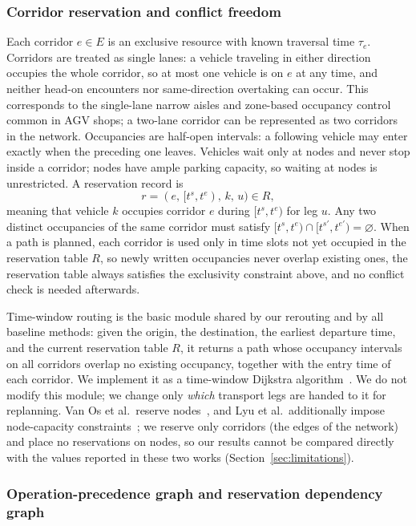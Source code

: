 \documentclass[manuscript,screen,review]{acmart}
\begin{document}
\subsubsection{Corridor reservation and conflict freedom}
\label{sec:reservation}

Each corridor \(e\in E\) is an exclusive resource with known traversal time \(\tau_e\). Corridors are treated as single lanes:
a vehicle traveling in either direction occupies the whole corridor, so at most one vehicle is on \(e\) at any time,
and neither head-on encounters nor same-direction overtaking can occur.
This corresponds to the single-lane narrow aisles and zone-based occupancy control common in AGV shops;
a two-lane corridor can be represented as two corridors in the network.
Occupancies are half-open intervals: a following vehicle may enter exactly when the preceding one leaves.
Vehicles wait only at nodes and never stop inside a corridor; nodes have ample parking capacity, so waiting at nodes is unrestricted.
A reservation record is
\[
r=(e,\,[t^s,t^e),\,k,\,u)\in R,
\]
meaning that vehicle \(k\) occupies corridor \(e\) during \([t^s,t^e)\) for leg \(u\).
Any two distinct occupancies of the same corridor must satisfy
\([t^s,t^e)\cap[t^{s\prime},t^{e\prime})=\varnothing\).
When a path is planned, each corridor is used only in time slots not yet occupied in the reservation table \(R\),
so newly written occupancies never overlap existing ones, the reservation table always satisfies the exclusivity constraint above, and no conflict check is needed afterwards.

Time-window routing is the basic module shared by our rerouting and by all baseline methods: given the origin, the destination, the earliest departure time, and the current reservation table \(R\),
it returns a path whose occupancy intervals on all corridors overlap no existing occupancy, together with the entry time of each corridor.
We implement it as a time-window Dijkstra algorithm~\cite{sun2023integrated}. We do not modify this module;
we change only \emph{which} transport legs are handed to it for replanning.
Van Os et al.\ reserve nodes~\cite{vanos2026exact}, and Lyu et al.\ additionally impose node-capacity constraints~\cite{lyu2019approach};
we reserve only corridors (the edges of the network) and place no reservations on nodes,
so our results cannot be compared directly with the values reported in these two works (Section~\ref{sec:limitations}).

\subsubsection{Operation-precedence graph and reservation dependency graph}
\label{sec:two_graphs}
\end{document}
